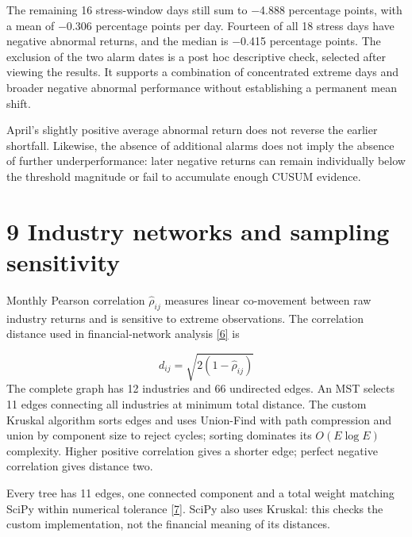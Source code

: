 \documentclass[11pt,a4paper]{article}
\begin{document}
The remaining 16 stress-window days still sum to $-$4.888 percentage points, with a mean of $-$0.306 percentage points per day. Fourteen of all 18 stress days have negative abnormal returns, and the median is $-$0.415 percentage points. The exclusion of the two alarm dates is a post hoc descriptive check, selected after viewing the results. It supports a combination of concentrated extreme days and broader negative abnormal performance without establishing a permanent mean shift.

April's slightly positive average abnormal return does not reverse the earlier shortfall. Likewise, the absence of additional alarms does not imply the absence of further underperformance: later negative returns can remain individually below the threshold magnitude or fail to accumulate enough CUSUM evidence.

\clearpage
\section*{9 Industry networks and sampling sensitivity}
Monthly Pearson correlation $\widehat\rho_{ij}$ measures linear co-movement between raw industry returns and is sensitive to extreme observations. The correlation distance used in financial-network analysis \hyperlink{ref6}{[6]} is

\begin{equation}d_{ij}=\sqrt{2(1-\hat\rho_{ij})}\label{eq:distance}\end{equation}
The complete graph has 12 industries and 66 undirected edges. An MST selects 11 edges connecting all industries at minimum total distance. The custom Kruskal algorithm sorts edges and uses Union-Find with path compression and union by component size to reject cycles; sorting dominates its $O(E\log E)$ complexity. Higher positive correlation gives a shorter edge; perfect negative correlation gives distance two.

Every tree has 11 edges, one connected component and a total weight matching SciPy within numerical tolerance \hyperlink{ref7}{[7]}. SciPy also uses Kruskal: this checks the custom implementation, not the financial meaning of its distances.
\end{document}
